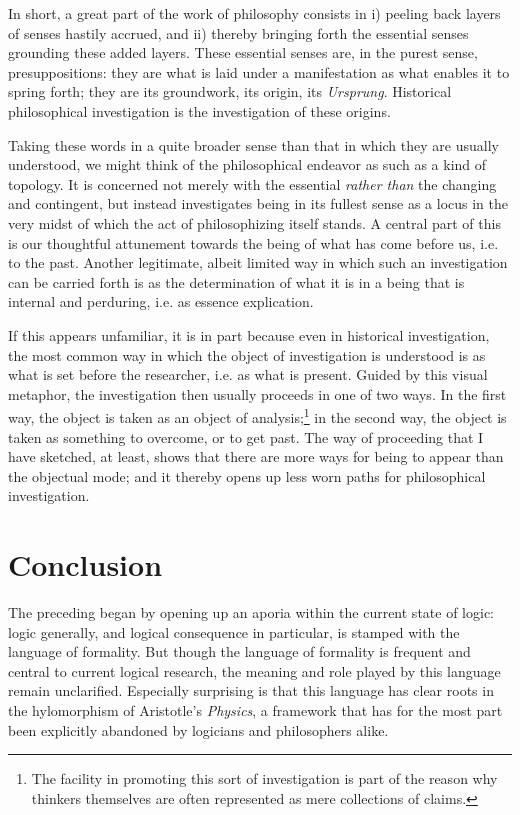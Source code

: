 \documentclass[]{article}
\begin{document}
In short, a great part of the work of philosophy consists in i) peeling back layers of senses hastily accrued, and ii) thereby bringing forth the essential senses grounding these added layers. These essential senses are, in the purest sense, presuppositions: they are what is laid under a manifestation as what enables it to spring forth; they are its groundwork, its origin, its \textit{Ursprung}. Historical philosophical investigation is the investigation of these origins.

Taking these words in a quite broader sense than that in which they are usually understood, we might think of the philosophical endeavor as such as a kind of topology. It is concerned not merely with the essential \textit{rather than} the changing and contingent, but instead investigates being in its fullest sense as a locus in the very midst of which the act of philosophizing itself stands. A central part of this is our thoughtful attunement towards the being of what has come before us, i.e. to the past. Another legitimate, albeit limited way in which such an investigation can be carried forth is as the determination of what it is in a being that is internal and perduring, i.e. as essence explication.

If this appears unfamiliar, it is in part because even in historical investigation, the most common way in which the object of investigation is understood is as what is set before the researcher, i.e. as what is present. Guided by this visual metaphor, the investigation then usually proceeds in one of two ways. In the first way, the object is taken as an object of analysis;\footnote{The facility in promoting this sort of investigation is part of the reason why thinkers themselves are often represented as mere collections of claims.} in the second way, the object is taken as something to overcome, or to get past. The way of proceeding that I have sketched, at least, shows that there are more ways for being to appear than the objectual mode; and it thereby opens up less worn paths for philosophical investigation.

\section{Conclusion}
The preceding began by opening up an aporia within the current state of logic: logic generally, and logical consequence in particular, is stamped with the language of formality. But though the language of formality is frequent and central to current logical research, the meaning and role played by this language remain unclarified. Especially surprising is that this language has clear roots in the hylomorphism of Aristotle's \textit{Physics}, a framework that has for the most part been explicitly abandoned by logicians and philosophers alike. 
\end{document}
